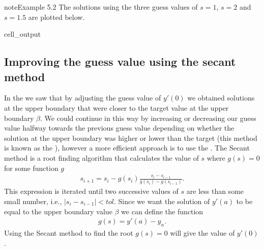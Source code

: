 \documentclass[letterpaper,10pt,english]{jupyterBook}
\begin{document}
\begin{sphinxadmonition}{note}{Example 5.2}
\sphinxAtStartPar
The solutions using the three guess values of \(s=1\), \(s=2\) and \(s=1.5\) are plotted below.
\begin{sphinxVerbatimOutput}

\begin{sphinxuseclass}{cell_output}
\noindent{}

\end{sphinxuseclass}\end{sphinxVerbatimOutput}
\end{sphinxadmonition}


\subsection{Improving the guess value using the secant method}
\label{\detokenize{5_BVPs/5.1_Shooting_method:improving-the-guess-value-using-the-secant-method}}\label{\detokenize{5_BVPs/5.1_Shooting_method:secant-method-section}}
\sphinxAtStartPar
In the {\hyperref[\detokenize{5_BVPs/5.1_Shooting_method:shooting-example-1}]{}} we saw that by adjusting the guess value of \(y'(0)\) we obtained solutions at the upper boundary that were closer to the target value at the upper boundary \(\beta\). We could continue in this way by increasing or decreasing our guess value halfway towards the previous guess value depending on whether the solution at the upper boundary was higher or lower than the target (this method is known as the ), however a more efficient approach is to use the . The Secant method is a root finding algorithm that calculates the value of \(s\) where \(g(s)=0\) for some function \(g\)
\begin{equation}\label{equation:5_BVPs/5.1_Shooting_method:secant-method-equation}
\begin{split}s_{i+1} = s_i - g(s_i)\frac{s_i - s_{i-1}}{g(s_i) - g(s_{i-1})}.\end{split}
\end{equation}
\sphinxAtStartPar
This expression is iterated until two successive values of \(s\) are less than some small number, i.e., \(|s_i - s_{i-1}| < tol\). Since we want the solution of \(y'(a)\) to be equal to the upper boundary value \(\beta\) we can define the function
\begin{align*}
    g(s) = y'(a) - y_n.
\end{align*}
\sphinxAtStartPar
Using the Secant method to find the root \(g(s) = 0\) will give the value of \(y'(0)\).
\end{document}
